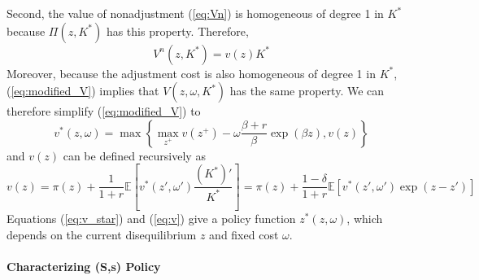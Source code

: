\documentclass[12pt]{article}
\begin{document}
Second, the value of nonadjustment (\ref{eq:Vn}) is homogeneous of degree 1 in $K^*$ because $\Pi(z, K^*)$ has this property. Therefore,
\begin{equation}
	V^n(z, K^*) = v(z) K^*
\end{equation}
Moreover, because the adjustment cost is also homogeneous of degree 1 in $K^*$, (\ref{eq:modified_V}) implies that $V(z,\omega, K^*)$ has the same property. We can therefore simplify (\ref{eq:modified_V}) to
\begin{equation} \label{eq:v_star}
	v^*(z, \omega) = \max \left\{\max_{z^+} v(z^+) - \omega \frac{\beta + r}{\beta} \exp(\beta z), v(z)\right\}
\end{equation}
and $v(z)$ can be defined recursively as
\begin{equation} \label{eq:v}
	v(z) = \pi(z) + \frac{1}{1+r} \mathbb{E}\left[v^*(z', \omega')\frac{(K^*)'}{K^*}\right] =  \pi(z) + \frac{1-\delta}{1+r} \mathbb{E}\left[v^*(z', \omega')\exp(z-z')\right]
\end{equation}
Equations (\ref{eq:v_star}) and (\ref{eq:v}) give a policy function $z^*(z, \omega)$, which depends on the current disequilibrium $z$ and fixed cost $\omega$.

\paragraph{Characterizing (S,s) Policy \\ [6pt]}
\end{document}
